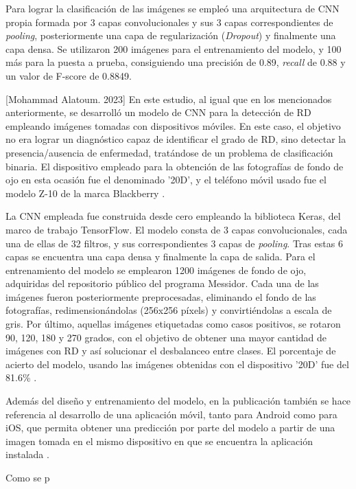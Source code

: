 Para lograr la clasificación de las imágenes se empleó una arquitectura de CNN propia formada por 3 capas convolucionales y sus 3 capas correspondientes de \textit{pooling}, posteriormente una capa de regularización (\textit{Dropout}) y finalmente una capa densa. Se utilizaron 200 imágenes para el entrenamiento del modelo, y 100 más para la puesta a prueba, consiguiendo una precisión de 0.89, \textit{recall} de 0.88 y un valor de F-score de 0.8849.

[Mohammad Alatoum. 2023] En este estudio, al igual que en los mencionados anteriormente, se desarrolló un modelo de CNN para la detección de RD empleando imágenes tomadas con dispositivos móviles. En este caso, el objetivo no era lograr un diagnóstico capaz de identificar el grado de RD, sino detectar la presencia/ausencia de enfermedad, tratándose de un problema de clasificación binaria. El dispositivo empleado para la obtención de las fotografías de fondo de ojo en esta ocasión fue el denominado '20D', y el teléfono móvil usado fue el modelo Z-10 de la marca Blackberry \cite{soa:mohammad}.

La CNN empleada fue construida desde cero empleando la biblioteca Keras, del marco de trabajo TensorFlow. El modelo consta de 3 capas convolucionales, cada una de ellas de 32 filtros, y sus correspondientes 3 capas de \textit{pooling}. Tras estas 6 capas se encuentra una capa densa y finalmente la capa de salida. Para el entrenamiento del modelo se emplearon 1200 imágenes de fondo de ojo, adquiridas del repositorio público del programa Messidor. Cada una de las imágenes fueron posteriormente preprocesadas, eliminando el fondo de las fotografías, redimensionándolas (256x256 píxels) y convirtiéndolas a escala de gris. Por último, aquellas imágenes etiquetadas como casos positivos, se rotaron 90, 120, 180 y 270 grados, con el objetivo de obtener una mayor cantidad de imágenes con RD y así solucionar el desbalanceo entre clases. El porcentaje de acierto del modelo, usando las imágenes obtenidas con el dispositivo '20D' fue del 81.6\% \cite{soa:mohammad}.

Además del diseño y entrenamiento del modelo, en la publicación también se hace referencia al desarrollo de una aplicación móvil, tanto para Android como para iOS, que permita obtener una predicción por parte del modelo a partir de una imagen tomada en el mismo dispositivo en que se encuentra la aplicación instalada \cite{soa:mohammad}.

Como se p
